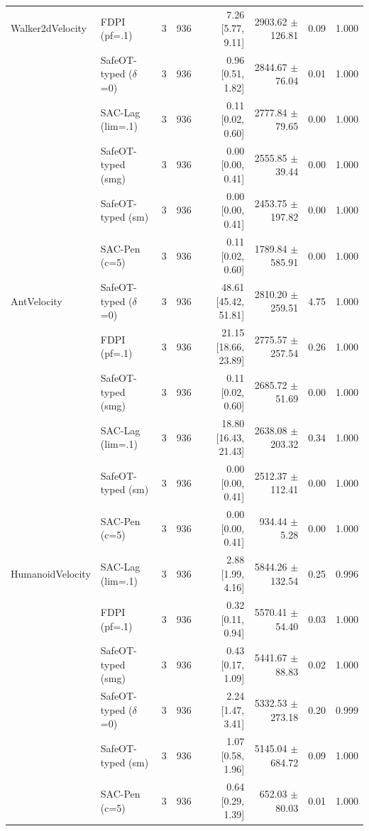 \begin{tabular}{llrrrrrr}
\midrule
Walker2dVelocity & FDPI (pf=.1) & 3 & 936 & 7.26 [5.77, 9.11] & 2903.62 $\pm$ 126.81 & 0.09 & 1.000 \\
 & SafeOT-typed ($\delta$=0) & 3 & 936 & 0.96 [0.51, 1.82] & 2844.67 $\pm$ 76.04 & 0.01 & 1.000 \\
 & SAC-Lag (lim=.1) & 3 & 936 & 0.11 [0.02, 0.60] & 2777.84 $\pm$ 79.65 & 0.00 & 1.000 \\
 & SafeOT-typed (smg) & 3 & 936 & 0.00 [0.00, 0.41] & 2555.85 $\pm$ 39.44 & 0.00 & 1.000 \\
 & SafeOT-typed (sm) & 3 & 936 & 0.00 [0.00, 0.41] & 2453.75 $\pm$ 197.82 & 0.00 & 1.000 \\
 & SAC-Pen (c=5) & 3 & 936 & 0.11 [0.02, 0.60] & 1789.84 $\pm$ 585.91 & 0.00 & 1.000 \\
\midrule
AntVelocity & SafeOT-typed ($\delta$=0) & 3 & 936 & 48.61 [45.42, 51.81] & 2810.20 $\pm$ 259.51 & 4.75 & 1.000 \\
 & FDPI (pf=.1) & 3 & 936 & 21.15 [18.66, 23.89] & 2775.57 $\pm$ 257.54 & 0.26 & 1.000 \\
 & SafeOT-typed (smg) & 3 & 936 & 0.11 [0.02, 0.60] & 2685.72 $\pm$ 51.69 & 0.00 & 1.000 \\
 & SAC-Lag (lim=.1) & 3 & 936 & 18.80 [16.43, 21.43] & 2638.08 $\pm$ 203.32 & 0.34 & 1.000 \\
 & SafeOT-typed (sm) & 3 & 936 & 0.00 [0.00, 0.41] & 2512.37 $\pm$ 112.41 & 0.00 & 1.000 \\
 & SAC-Pen (c=5) & 3 & 936 & 0.00 [0.00, 0.41] & 934.44 $\pm$ 5.28 & 0.00 & 1.000 \\
\midrule
HumanoidVelocity & SAC-Lag (lim=.1) & 3 & 936 & 2.88 [1.99, 4.16] & 5844.26 $\pm$ 132.54 & 0.25 & 0.996 \\
 & FDPI (pf=.1) & 3 & 936 & 0.32 [0.11, 0.94] & 5570.41 $\pm$ 54.40 & 0.03 & 1.000 \\
 & SafeOT-typed (smg) & 3 & 936 & 0.43 [0.17, 1.09] & 5441.67 $\pm$ 88.83 & 0.02 & 1.000 \\
 & SafeOT-typed ($\delta$=0) & 3 & 936 & 2.24 [1.47, 3.41] & 5332.53 $\pm$ 273.18 & 0.20 & 0.999 \\
 & SafeOT-typed (sm) & 3 & 936 & 1.07 [0.58, 1.96] & 5145.04 $\pm$ 684.72 & 0.09 & 1.000 \\
 & SAC-Pen (c=5) & 3 & 936 & 0.64 [0.29, 1.39] & 652.03 $\pm$ 80.03 & 0.01 & 1.000 \\
\bottomrule
\end{tabular}
